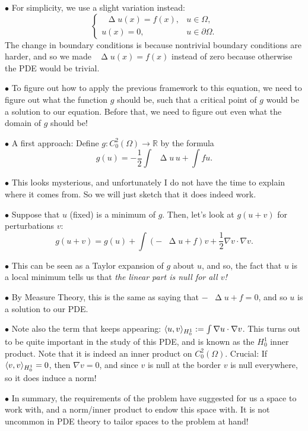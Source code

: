 \documentclass{article}
\newcommand{\R}{\mathbb{R}}
\newcommand{\lap}{\mathop{}\!\mathbin{\Delta}}
\DeclarePairedDelimiter{\braket}{\langle}{\rangle}
\newcommand\point[1]{\noindent \hspace{\labelsep} $\bullet$ #1 \smallskip}
\begin{document}
\point{For simplicity, we use a slight variation instead:
\begin{equation}
\begin{cases}
\lap u(x) = f(x), & u \in \Omega,\\
u(x) = 0, & u \in \partial\Omega.
\end{cases}
\end{equation}
The change in boundary conditions is because nontrivial boundary conditions are harder, and so we made $\lap u(x) = f(x)$ instead of zero because otherwise the PDE would be trivial.}

\point{To figure out how to apply the previous framework to this equation, we need to figure out what the function $g$ should be, such that a critical point of $g$ would be a solution to our equation. Before that, we need to figure out even what the domain of $g$ should be!}

\point{A first approach: Define $g \colon C^2_0(\Omega) \to \R$ by the formula
\begin{equation}
g(u) = - \frac12 \int \lap u \, u + \int f u.
\end{equation}}

\point{This looks mysterious, and unfortunately I do not have the time to explain where it comes from. So we will just sketch that it does indeed work.}

\point{Suppose that $u$ (fixed) is a minimum of $g$. Then, let's look at $g(u+v)$ for perturbations $v$:
\begin{equation}
g(u+v) = g(u) + \int (-\lap u + f)v + \frac12 \nabla v \cdot \nabla v.
\end{equation}}

\point{This can be seen as a Taylor expansion of $g$ about $u$, and so, the fact that $u$ is a local minimum tells us that \emph{the linear part is null for all $v$!}}

\point{By Measure Theory, this is the same as saying that $-\lap u + f = 0$, and so $u$ is a solution to our PDE.}

\point{Note also the term that keeps appearing: $\braket{u,v}_{H^1_0} := \int \nabla u \cdot \nabla v$. This turns out to be quite important in the study of this PDE, and is known as the $H^1_0$ inner product. Note that it is indeed an inner product on $C^2_0(\Omega)$. Crucial: If $\braket{v,v}_{H^1_0} = 0$, then $\nabla v = 0$, and since $v$ is null at the border $v$ is null everywhere, so it does induce a norm!}

\point{In summary, the requirements of the problem have suggested for us a space to work with, and a norm/inner product to endow this space with. It is not uncommon in PDE theory to tailor spaces to the problem at hand!}
\end{document}
